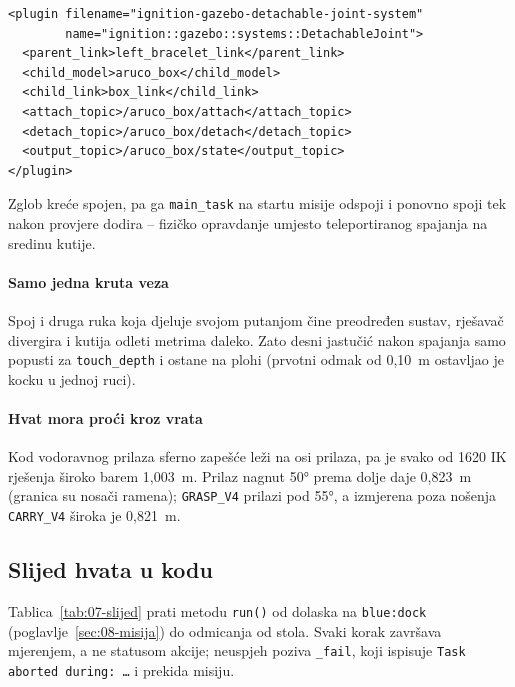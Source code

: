 \begin{lstlisting}[style=code-xml, caption={Kruti spoj kutije, aktivan tek nakon dokazanog kontakta (\texttt{robot.urdf.xacro}, redci 231--240)}, label={lst:urdf-kontakt}]
<plugin filename="ignition-gazebo-detachable-joint-system"
        name="ignition::gazebo::systems::DetachableJoint">
  <parent_link>left_bracelet_link</parent_link>
  <child_model>aruco_box</child_model>
  <child_link>box_link</child_link>
  <attach_topic>/aruco_box/attach</attach_topic>
  <detach_topic>/aruco_box/detach</detach_topic>
  <output_topic>/aruco_box/state</output_topic>
</plugin>
\end{lstlisting}

Zglob kreće spojen, pa ga \texttt{main\_task} na startu misije odspoji i ponovno spoji tek nakon
provjere dodira -- fizičko opravdanje umjesto teleportiranog spajanja na sredinu kutije.

\paragraph{Samo jedna kruta veza} Spoj i druga ruka koja djeluje svojom putanjom čine preodređen
sustav, rješavač divergira i kutija odleti metrima daleko. Zato desni jastučić nakon spajanja samo
popusti za \texttt{touch\_depth} i ostane na plohi (prvotni odmak od 0{,}10~m ostavljao je kocku u
jednoj ruci).

\paragraph{Hvat mora proći kroz vrata} Kod vodoravnog prilaza sferno zapešće leži na osi prilaza, pa je
svako od 1620 IK rješenja široko barem 1{,}003~m. Prilaz nagnut 50° prema dolje daje 0{,}823~m (granica
su nosači ramena); \texttt{GRASP\_V4} prilazi pod 55°, a izmjerena poza nošenja \texttt{CARRY\_V4} široka
je 0{,}821~m.

\subsection{Slijed hvata u kodu}
\label{sec:07-slijed}

Tablica~\ref{tab:07-slijed} prati metodu \texttt{run()} od dolaska na \texttt{blue:dock}
(poglavlje~\ref{sec:08-misija}) do odmicanja od stola. Svaki korak završava mjerenjem, a ne statusom
akcije; neuspjeh poziva \texttt{\_fail}, koji ispisuje \texttt{Task aborted during: \ldots} i prekida
misiju.

